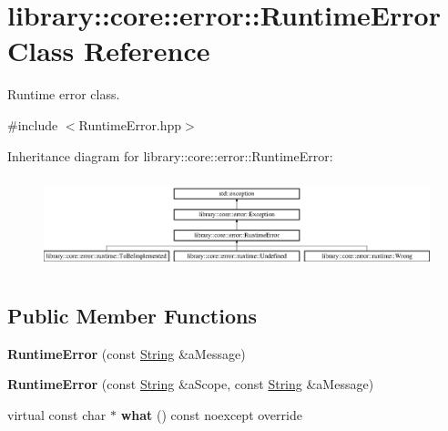 \hypertarget{classlibrary_1_1core_1_1error_1_1_runtime_error}{}\section{library\+:\+:core\+:\+:error\+:\+:Runtime\+Error Class Reference}
\label{classlibrary_1_1core_1_1error_1_1_runtime_error}


Runtime error class.  




{\ttfamily \#include $<$Runtime\+Error.\+hpp$>$}

Inheritance diagram for library\+:\+:core\+:\+:error\+:\+:Runtime\+Error\+:\begin{figure}[H]
\begin{center}
\leavevmode
\includegraphics[height=2.715152cm]{classlibrary_1_1core_1_1error_1_1_runtime_error}
\end{center}
\end{figure}
\subsection*{Public Member Functions}
\begin{DoxyCompactItemize}
\item 
\mbox{\label{classlibrary_1_1core_1_1error_1_1_runtime_error_a6ba0ac577d200ad5f83843ecbe775c2f}} 
{\bfseries Runtime\+Error} (const \hyperlink{classlibrary_1_1core_1_1types_1_1_string}{String} \&a\+Message)
\item 
\mbox{\label{classlibrary_1_1core_1_1error_1_1_runtime_error_ac0e3fcfbbd3636c42dc6e64461e41d85}} 
{\bfseries Runtime\+Error} (const \hyperlink{classlibrary_1_1core_1_1types_1_1_string}{String} \&a\+Scope, const \hyperlink{classlibrary_1_1core_1_1types_1_1_string}{String} \&a\+Message)
\item 
\mbox{\label{classlibrary_1_1core_1_1error_1_1_runtime_error_af3da31cf67f3f5e120c5db9072e3a801}} 
virtual const char $\ast$ {\bfseries what} () const noexcept override
\end{DoxyCompactItemize}


